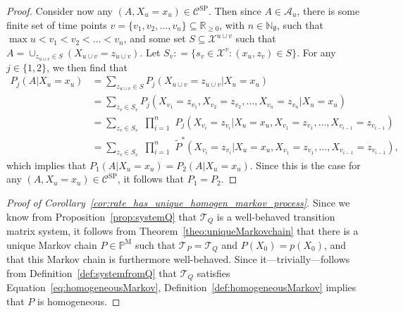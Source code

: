 \documentclass[10pt]{paper}
\theoremstyle{definition}
\newcommand{\nats}{\mathbb{N}}
\newcommand{\reals}{\mathbb{R}}
\newcommand{\states}{\mathcal{X}}
\newcommand{\processes}{\mathbb{P}}
\newcommand{\mprocesses}{\processes^{\mathrm{M}}}
\newcommand{\coloneqq}{:\!=}
\begin{document}
\begin{proof}
Consider now any $(A,X_u=x_u)\in\mathcal{C}^\mathrm{SP}$. Then since $A\in\mathcal{A}_u$, there is some finite set of time points $v=\{v_1,v_2,\dots,v_n\}\subseteq\reals_{\geq0}$, with $n\in\nats_\emptyset$, such that $\max u<v_1<v_2<\dots<v_n$, and some set $S\subseteq\states^{u\cup v}$ such that $A=\cup_{z_{u\cup v}\in S}(X_{u\cup v}=z_{u\cup v})$. 
Let $S_v\coloneqq\{s_v\in\states^v\colon (x_u,z_v)\in S\}$.
For any $j\in\{1,2\}$, we then find that
\begin{align*}
P_j(A\vert X_u=x_u)
&=\sum_{z_{u\cup v}\in S}
P_j(X_{u\cup v}=z_{u\cup v}\vert X_u=x_u)\\
&=\sum_{z_{v}\in S_v}
P_j(X_{v_1}=z_{v_1}, X_{v_2}=z_{v_2}, \dots, X_{v_n}=z_{v_n}\vert X_u=x_u)\\[-1mm]
&=\sum_{z_{v}\in S_v}
\,\,
\prod_{i=1}^n
\,\,
P_j(X_{v_i}=z_{v_i}\vert X_u=x_u, X_{v_1}=z_{v_1}, \dots, X_{v_{i-1}}=z_{v_{i-1}})\\
&=\sum_{z_{v}\in S_v}
\,\,
\prod_{i=1}^n
\,\,
\tilde{P}^*(X_{v_i}=z_{v_i}\vert X_u=x_u, X_{v_1}=z_{v_1}, \dots, X_{v_{i-1}}=z_{v_{i-1}}),
\end{align*}
which implies that $P_1(A\vert X_u=x_u)=P_2(A\vert X_u=x_u)$. Since this is the case for any $(A,X_u=x_u)\in\mathcal{C}^\mathrm{SP}$, it follows that $P_1=P_2$.
\end{proof}

\begin{proof}[Proof of Corollary~\ref{cor:rate_has_unique_homogen_markov_process}]
Since we know from Proposition~\ref{prop:systemQ} that $\mathcal{T}_Q$ is a well-behaved transition matrix system, it follows from Theorem~\ref{theo:uniqueMarkovchain} that there is a unique Markov chain $P\in\mprocesses$ such that $\mathcal{T}_P=\mathcal{T}_Q$ and $P(X_0)=p(X_0)$, and that this Markov chain is furthermore well-behaved. Since it---trivially---follows from Definition~\ref{def:systemfromQ} that $\mathcal{T}_Q$ satisfies Equation~\eqref{eq:homogeneousMarkov}, Definition~\ref{def:homogeneousMarkov} implies that $P$ is homogeneous.
\end{proof}
\end{document}
